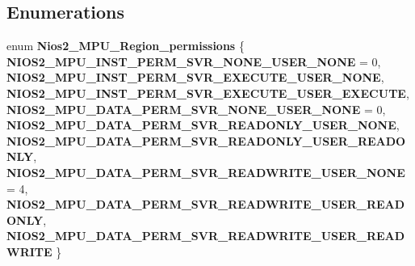 \subsection*{Enumerations}
\begin{DoxyCompactItemize}
\item 
\mbox{\label{nios2-utility_8h_a2b741c98b597629c6e592529a0fdf54d}} 
enum {\bfseries Nios2\+\_\+\+M\+P\+U\+\_\+\+Region\+\_\+permissions} \{ \newline
{\bfseries N\+I\+O\+S2\+\_\+\+M\+P\+U\+\_\+\+I\+N\+S\+T\+\_\+\+P\+E\+R\+M\+\_\+\+S\+V\+R\+\_\+\+N\+O\+N\+E\+\_\+\+U\+S\+E\+R\+\_\+\+N\+O\+NE} = 0, 
{\bfseries N\+I\+O\+S2\+\_\+\+M\+P\+U\+\_\+\+I\+N\+S\+T\+\_\+\+P\+E\+R\+M\+\_\+\+S\+V\+R\+\_\+\+E\+X\+E\+C\+U\+T\+E\+\_\+\+U\+S\+E\+R\+\_\+\+N\+O\+NE}, 
{\bfseries N\+I\+O\+S2\+\_\+\+M\+P\+U\+\_\+\+I\+N\+S\+T\+\_\+\+P\+E\+R\+M\+\_\+\+S\+V\+R\+\_\+\+E\+X\+E\+C\+U\+T\+E\+\_\+\+U\+S\+E\+R\+\_\+\+E\+X\+E\+C\+U\+TE}, 
{\bfseries N\+I\+O\+S2\+\_\+\+M\+P\+U\+\_\+\+D\+A\+T\+A\+\_\+\+P\+E\+R\+M\+\_\+\+S\+V\+R\+\_\+\+N\+O\+N\+E\+\_\+\+U\+S\+E\+R\+\_\+\+N\+O\+NE} = 0, 
\newline
{\bfseries N\+I\+O\+S2\+\_\+\+M\+P\+U\+\_\+\+D\+A\+T\+A\+\_\+\+P\+E\+R\+M\+\_\+\+S\+V\+R\+\_\+\+R\+E\+A\+D\+O\+N\+L\+Y\+\_\+\+U\+S\+E\+R\+\_\+\+N\+O\+NE}, 
{\bfseries N\+I\+O\+S2\+\_\+\+M\+P\+U\+\_\+\+D\+A\+T\+A\+\_\+\+P\+E\+R\+M\+\_\+\+S\+V\+R\+\_\+\+R\+E\+A\+D\+O\+N\+L\+Y\+\_\+\+U\+S\+E\+R\+\_\+\+R\+E\+A\+D\+O\+N\+LY}, 
{\bfseries N\+I\+O\+S2\+\_\+\+M\+P\+U\+\_\+\+D\+A\+T\+A\+\_\+\+P\+E\+R\+M\+\_\+\+S\+V\+R\+\_\+\+R\+E\+A\+D\+W\+R\+I\+T\+E\+\_\+\+U\+S\+E\+R\+\_\+\+N\+O\+NE} = 4, 
{\bfseries N\+I\+O\+S2\+\_\+\+M\+P\+U\+\_\+\+D\+A\+T\+A\+\_\+\+P\+E\+R\+M\+\_\+\+S\+V\+R\+\_\+\+R\+E\+A\+D\+W\+R\+I\+T\+E\+\_\+\+U\+S\+E\+R\+\_\+\+R\+E\+A\+D\+O\+N\+LY}, 
\newline
{\bfseries N\+I\+O\+S2\+\_\+\+M\+P\+U\+\_\+\+D\+A\+T\+A\+\_\+\+P\+E\+R\+M\+\_\+\+S\+V\+R\+\_\+\+R\+E\+A\+D\+W\+R\+I\+T\+E\+\_\+\+U\+S\+E\+R\+\_\+\+R\+E\+A\+D\+W\+R\+I\+TE}
 \}
\end{DoxyCompactItemize}
